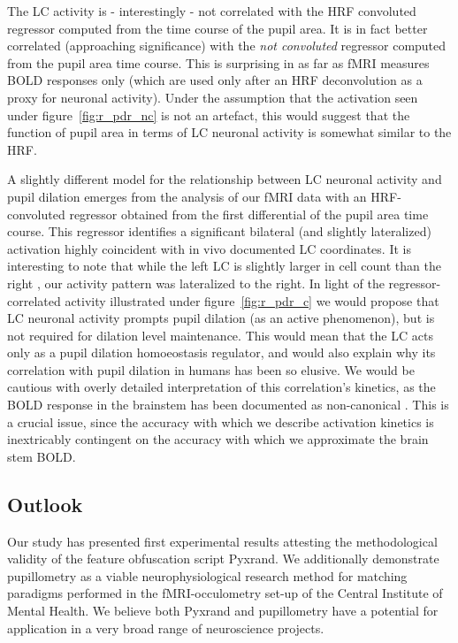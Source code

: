 	    The LC activity is - interestingly - not correlated with the HRF convoluted regressor computed from the time course of the pupil area.
	    It is in fact better correlated (approaching significance) with the \textit{not convoluted} regressor computed from the pupil area time course.
	    This is surprising in as far as fMRI measures BOLD responses only (which are used only after an HRF deconvolution as a proxy for neuronal activity).
	    Under the assumption that the activation seen under figure~\ref{fig:r_pdr_nc} is not an artefact, this would suggest that the function of pupil area in terms of LC neuronal activity is somewhat similar to the HRF.
	    
	    A slightly different model for the relationship between LC neuronal activity and pupil dilation emerges from the analysis of our fMRI data with an HRF-convoluted regressor obtained from the first differential of the pupil area time course.
	    This regressor identifies a significant bilateral (and slightly lateralized) activation highly coincident with in vivo documented LC coordinates.
	    It is interesting to note that while the left LC is slightly larger in cell count than the right \citep{Mouton1994}, our activity pattern was lateralized to the right.
	    In light of the regressor-correlated activity illustrated under figure~\ref{fig:r_pdr_c} we would propose that LC neuronal activity prompts pupil dilation (as an active phenomenon), but is not required for dilation level maintenance.
	    This would mean that the LC acts only as a pupil dilation homoeostasis regulator, and would also explain why its correlation with pupil dilation in humans has been so elusive.
	    We would be cautious with overly detailed interpretation of this correlation's kinetics, as the BOLD response in the brainstem has been documented as non-canonical \citep{Astafiev2010}.
	    This is a crucial issue, since the accuracy with which we describe activation kinetics is inextricably contingent on the accuracy with which we approximate the brain stem BOLD.
	    
	\subsection{Outlook}
	    Our study has presented first experimental results attesting the methodological validity of the feature obfuscation script Pyxrand.
	    We additionally demonstrate pupillometry as a viable neurophysiological research method for matching paradigms performed in the fMRI-occulometry set-up of the Central Institute of Mental Health.
	    We believe both Pyxrand and pupillometry have a potential for application in a very broad range of neuroscience projects.
	    
